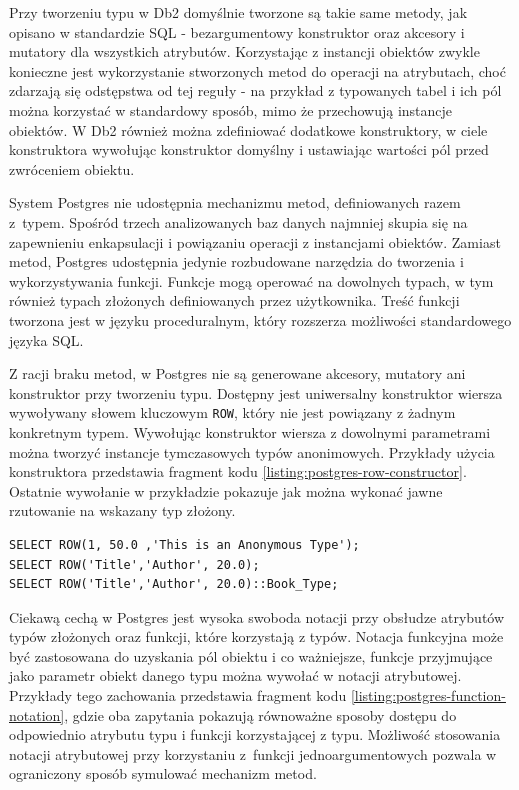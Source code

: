 \documentclass[a4paper,twoside,12pt]{book}
\begin{document}
Przy tworzeniu typu w Db2 domyślnie tworzone są takie same metody, jak opisano w standardzie SQL - bezargumentowy konstruktor oraz akcesory i mutatory dla wszystkich atrybutów. Korzystając z instancji obiektów zwykle konieczne jest wykorzystanie stworzonych metod do operacji na atrybutach, choć zdarzają się odstępstwa od tej reguły - na przykład z typowanych tabel i ich pól można korzystać w standardowy sposób, mimo że przechowują instancje obiektów. W Db2 również można zdefiniować dodatkowe konstruktory, w ciele konstruktora wywołując konstruktor domyślny i ustawiając wartości pól przed zwróceniem obiektu.

System Postgres nie udostępnia mechanizmu metod, definiowanych razem z~typem. Spośród trzech analizowanych baz danych najmniej skupia się na zapewnieniu enkapsulacji i powiązaniu operacji z instancjami obiektów. Zamiast metod, Postgres udostępnia jedynie rozbudowane narzędzia do tworzenia i wykorzystywania funkcji. Funkcje mogą operować na dowolnych typach, w tym również typach złożonych definiowanych przez użytkownika. Treść funkcji tworzona jest w języku proceduralnym, który rozszerza możliwości standardowego języka SQL.

Z racji braku metod, w Postgres nie są generowane akcesory, mutatory ani konstruktor przy tworzeniu typu. Dostępny jest uniwersalny konstruktor wiersza wywoływany słowem kluczowym \lstinline{ROW}, który nie jest powiązany z żadnym konkretnym typem. Wywołując konstruktor wiersza z dowolnymi parametrami można tworzyć instancje tymczasowych typów anonimowych. Przykłady użycia konstruktora przedstawia fragment kodu \ref{listing:postgres-row-constructor}. Ostatnie wywołanie w przykładzie pokazuje jak można wykonać jawne rzutowanie na wskazany typ złożony.

\begin{lstlisting}[style=SQL, caption={Wykorzystanie konstruktora wiersza w PostgreSQL.}, label={listing:postgres-row-constructor}, captionpos=b]
SELECT ROW(1, 50.0 ,'This is an Anonymous Type');
SELECT ROW('Title','Author', 20.0);
SELECT ROW('Title','Author', 20.0)::Book_Type;
\end{lstlisting}

Ciekawą cechą w Postgres jest wysoka swoboda notacji przy obsłudze atrybutów typów złożonych  oraz funkcji, które korzystają z typów. Notacja funkcyjna może być zastosowana do uzyskania pól obiektu i co ważniejsze, funkcje przyjmujące jako parametr obiekt danego typu można wywołać w notacji atrybutowej. Przykłady tego zachowania przedstawia fragment kodu \ref{listing:postgres-function-notation}, gdzie oba zapytania pokazują równoważne sposoby dostępu do odpowiednio atrybutu typu i funkcji korzystającej z typu. Możliwość stosowania notacji atrybutowej przy korzystaniu z~funkcji jednoargumentowych pozwala w ograniczony sposób symulować mechanizm metod.
\end{document}
